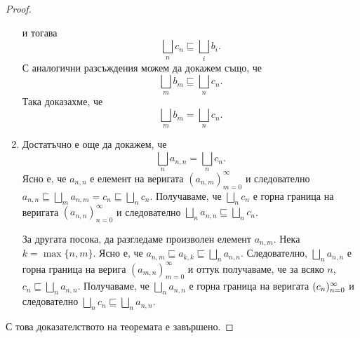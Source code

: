 \begin{proof}
\begin{enumerate}[1)]
    и тогава \[\bigsqcup_n c_n \sqsubseteq \bigsqcup_i b_i.\]
    С аналогични разсъждения можем да докажем също, че 
    \[\bigsqcup_m b_m \sqsubseteq \bigsqcup_n c_n.\]
    Така доказахме, че \[\bigsqcup_m b_m = \bigsqcup_n c_n.\]
  \item
    Достатъчно е още да докажем, че
    \[\bigsqcup_n a_{n,n} = \bigsqcup_n c_n.\]
    Ясно е, че $a_{n,n}$ е елемент на веригата ${(a_{n,m})}^{\infty}_{m=0}$ и следователно
    $a_{n,n} \sqsubseteq \bigsqcup_m a_{n,m} = c_n \sqsubseteq \bigsqcup_n c_n$.
    Получаваме, че $\bigsqcup_n c_n$ е горна граница на веригата ${(a_{n,n})}^{\infty}_{n=0}$
    и следователно $\bigsqcup_n a_{n,n} \sqsubseteq \bigsqcup_n c_n$.
    
    За другата посока, да разгледаме произволен елемент $a_{n,m}$.
    Нека $k = \max\{n,m\}$.
    Ясно е, че $a_{n,m} \sqsubseteq a_{k,k} \sqsubseteq \bigsqcup_n a_{n,n}$.
    Следователно, $\bigsqcup_n a_{n,n}$ е горна граница на верига ${(a_{m,n})}^{\infty}_{m=0}$
    и оттук получаваме, че за всяко $n$, $c_n \sqsubseteq \bigsqcup_n a_{n,n}$.
    Получаваме, че $\bigsqcup_n a_{n,n}$ е горна граница на веригата $(c_{n})^{\infty}_{n=0}$ и следователно
    $\bigsqcup_n c_n \sqsubseteq \bigsqcup_n a_{n,n}$.
  \end{enumerate}
  С това доказателството на теоремата е завършено.
\end{proof}

